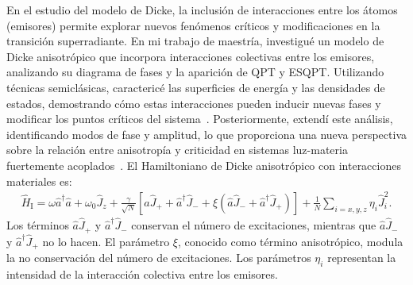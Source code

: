 \documentclass[onecolumn,notitlepage,letterpaper,aps,pra,12pt]{article}
\numberwithin{equation}{section}
\begin{document}
En el estudio del modelo de Dicke, la inclusión de interacciones entre los átomos (emisores) permite explorar nuevos fenómenos críticos y modificaciones en la transición superradiante. En mi trabajo de maestría, investigué un modelo de Dicke anisotrópico que incorpora interacciones colectivas entre los emisores, analizando su diagrama de fases y la aparición de QPT y ESQPT. Utilizando técnicas semiclásicas, caractericé las superficies de energía y las densidades de estados, demostrando cómo estas interacciones pueden inducir nuevas fases y modificar los puntos críticos del sistema~\cite{Herrera2022}. Posteriormente, extendí este análisis, identificando modos de fase y amplitud, lo que proporciona una nueva perspectiva sobre la relación entre anisotropía y criticidad en sistemas luz-materia fuertemente acoplados~\cite{herrera2024}. El Hamiltoniano de Dicke anisotrópico con interacciones materiales es:
\begin{gather}
    \hat{H}_{\text{I}} = \omega\hat{a}^{\dagger}\hat{a} + \omega_{0}\hat{J}_{z} + \frac{\gamma}{\sqrt{N}}\left[ \hat{a}\hat{J}_{+} + \hat{a}^{\dagger}\hat{J}_{-} + \xi\left( \hat{a}\hat{J}_{-} + \hat{a}^{\dagger}\hat{J}_{+} \right)  \right] + \frac{1}{N}\sum_{i=x,y,z} \eta_{i}\hat{J}_{i}^{2}.
\end{gather}
Los términos $\hat{a}\hat{J}_{+}$ y $\hat{a}^{\dagger}\hat{J}_{-}$ conservan el número de excitaciones, mientras que $\hat{a}\hat{J}_{-}$ y $\hat{a}^{\dagger}\hat{J}_{+}$ no lo hacen. El parámetro $\xi$, conocido como término anisotrópico, modula la no conservación del número de excitaciones. Los parámetros $\eta_{i}$ representan la intensidad de la interacción colectiva entre los emisores.
\end{document}
